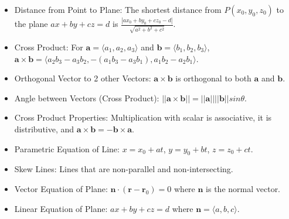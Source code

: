 \documentclass[10pt, portrait]{article}
\begin{document}
\begin{multicols*}{2}
\begin{itemize}
    \item Distance from Point to Plane: The shortest distance from $P(x_0,y_0,z_0)$ to the plane $ax+by+cz=d$ is $\frac{|ax_0+by_0+cz_0-d|}{\sqrt{a^2+b^2+c^2}}$.
    \item Cross Product: For $\bm{a}=\langle a_1,a_2,a_3\rangle$ and $\bm{b}=\langle b_1,b_2,b_3\rangle$, $\bm{a}\times\bm{b}=\langle a_2b_3-a_3b_2,-(a_1b_3-a_3b_1),a_1b_2-a_2b_1\rangle$.
    \item Orthogonal Vector to 2 other Vectors: $\bm{a}\times\bm{b}$ is orthogonal to both $\bm{a}$ and $\bm{b}$.
    \item Angle between Vectors (Cross Product): $||\bm{a}\times\bm{b}||=||\bm{a}||||\bm{b}||sin\theta$.
    \item Cross Product Properties: Multiplication with scalar is associative, it is distributive, and $\bm{a}\times\bm{b}=-\bm{b}\times\bm{a}$.
    \item Parametric Equation of Line: $x=x_0+at$, $y=y_0+bt$, $z=z_0+ct$.
    \item Skew Lines: Lines that are non-parallel and non-intersecting.
    \item Vector Equation of Plane: $\bm{n}\cdot(\bm{r}-\bm{r}_0)=0$ where $\bm{n}$ is the normal vector.
    \item Linear Equation of Plane: $ax+by+cz=d$ where $\bm{n}=\langle a,b,c\rangle$.
\end{itemize}


\end{multicols*}
\end{document}
